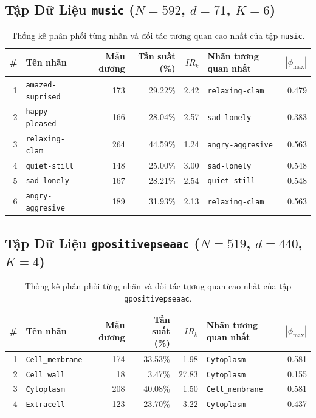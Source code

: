 \documentclass[11pt,a4paper]{article}
\begin{document}
\subsection{Tập Dữ Liệu \texttt{music} ($N=592$, $d=71$, $K=6$)}
\begin{table}[htbp]
\centering
\footnotesize
\caption{Thống kê phân phối từng nhãn và đối tác tương quan cao nhất của tập \texttt{music}.}
\begin{tabularx}{0.95\textwidth}{r l r r r l r}
\toprule
\textbf{\#} & \textbf{Tên nhãn} & \textbf{Mẫu dương} & \textbf{Tần suất (\%)} & \textbf{$IR_k$} & \textbf{Nhãn tương quan nhất} & \textbf{$|\phi_{\max}|$} \\
\midrule
1 & \texttt{amazed-suprised} & 173 & 29.22\% & 2.42 & \texttt{relaxing-clam} & 0.479 \\
2 & \texttt{happy-pleased} & 166 & 28.04\% & 2.57 & \texttt{sad-lonely} & 0.383 \\
3 & \texttt{relaxing-clam} & 264 & 44.59\% & 1.24 & \texttt{angry-aggresive} & 0.563 \\
4 & \texttt{quiet-still} & 148 & 25.00\% & 3.00 & \texttt{sad-lonely} & 0.548 \\
5 & \texttt{sad-lonely} & 167 & 28.21\% & 2.54 & \texttt{quiet-still} & 0.548 \\
6 & \texttt{angry-aggresive} & 189 & 31.93\% & 2.13 & \texttt{relaxing-clam} & 0.563 \\
\bottomrule
\end{tabularx}
\end{table}

\subsection{Tập Dữ Liệu \texttt{gpositivepseaac} ($N=519$, $d=440$, $K=4$)}
\begin{table}[htbp]
\centering
\footnotesize
\caption{Thống kê phân phối từng nhãn và đối tác tương quan cao nhất của tập \texttt{gpositivepseaac}.}
\begin{tabularx}{0.95\textwidth}{r l r r r l r}
\toprule
\textbf{\#} & \textbf{Tên nhãn} & \textbf{Mẫu dương} & \textbf{Tần suất (\%)} & \textbf{$IR_k$} & \textbf{Nhãn tương quan nhất} & \textbf{$|\phi_{\max}|$} \\
\midrule
1 & \texttt{Cell\_membrane} & 174 & 33.53\% & 1.98 & \texttt{Cytoplasm} & 0.581 \\
2 & \texttt{Cell\_wall} & 18 & 3.47\% & 27.83 & \texttt{Cytoplasm} & 0.155 \\
3 & \texttt{Cytoplasm} & 208 & 40.08\% & 1.50 & \texttt{Cell\_membrane} & 0.581 \\
4 & \texttt{Extracell} & 123 & 23.70\% & 3.22 & \texttt{Cytoplasm} & 0.437 \\
\bottomrule
\end{tabularx}
\end{table}
\end{document}
